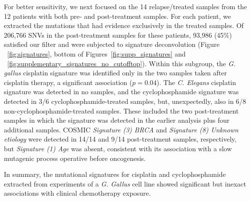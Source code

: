 For better sensitivity, we next focused on the 14 relapse/treated samples from the 12 patients with both pre- and post-treatment samples. For each patient, we extracted the mutations that had evidence exclusively in the treated samples. Of 206,766 SNVs in the post-treatment samples for these patients, 93,986 (45\%) satisfied our filter and were subjected to signature deconvolution (Figure ~\ref{fig:signatures}, bottom of Figures~\ref{fig:supp_signatures} and ~\ref{fig:supplementary_signatures_no_cutofftop}). Within this subgroup, the \textit{G. gallus} cisplatin signature was identified only in the two samples taken after cisplatin therapy, a significant association ($p = 0.04$). The \textit{C. Elegans} cisplatin signature was detected in no samples, and the cyclophosphamide signature was detected in 3/6 cyclophosphamide-treated samples, but, unexpectedly, also in 6/8 non-cyclophosphamide-treated samples. These included the two post-treatment samples in which the signature was detected in the earlier analysis plus four additional samples. COSMIC \textit{Signature (3) BRCA} and \textit{Signature (8) Unknown etiology} were detected in 14/14 and 9/14 post-treatment samples, respectively, but \textit{Signature (1) Age} was absent, consistent with its association with a slow mutagenic process operative before oncogenesis.

In summary, the mutational signatures for cisplatin and cyclophosphamide extracted from experiments of a \textit{G. Gallus} cell line showed significant but inexact associations with clinical chemotherapy exposure.

